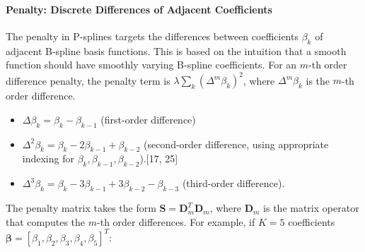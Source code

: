 \documentclass[11pt, a4paper]{article}
\begin{document}
\paragraph{Penalty: Discrete Differences of Adjacent Coefficients}
The penalty in P-splines targets the differences between coefficients $\beta_k$ of adjacent B-spline basis functions. This is based on the intuition that a smooth function should have smoothly varying B-spline coefficients.
For an $m$-th order difference penalty, the penalty term is $\lambda \sum_{k} (\Delta^m \beta_k)^2$, where $\Delta^m \beta_k$ is the $m$-th order difference.
\begin{itemize}
 \item $\Delta \beta_k = \beta_k - \beta_{k-1}$ (first-order difference)
 \item $\Delta^2 \beta_k = \beta_k - 2\beta_{k-1} + \beta_{k-2}$ (second-order difference, using appropriate indexing for $\beta_k, \beta_{k-1}, \beta_{k-2}$).[17, 25]
 \item $\Delta^3 \beta_k = \beta_k - 3\beta_{k-1} + 3\beta_{k-2} - \beta_{k-3}$ (third-order difference).
\end{itemize}
The penalty matrix takes the form $\mathbf{S} = \mathbf{D}_m^T \mathbf{D}_m$, where $\mathbf{D}_m$ is the matrix operator that computes the $m$-th order differences.
For example, if $K=5$ coefficients $\boldsymbol{\beta} = [\beta_1, \beta_2, \beta_3, \beta_4, \beta_5]^T$:
\end{document}
